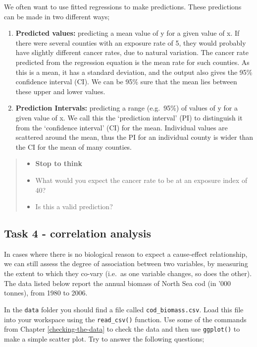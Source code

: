 \documentclass[
]{book}
\providecommand{\tightlist}{%
  \setlength{\itemsep}{0pt}\setlength{\parskip}{0pt}}
\begin{document}
We often want to use fitted regressions to make predictions. These predictions can be made in two different ways;

\begin{enumerate}
\def\labelenumi{\arabic{enumi})}
\tightlist
\item
  \textbf{Predicted values:} predicting a mean value of y for a given value of x. If there were several counties with an exposure rate of 5, they would probably have slightly different cancer rates, due to natural variation. The cancer rate predicted from the regression equation is the mean rate for such counties. As this is a mean, it has a standard deviation, and the output also gives the 95\% confidence interval (CI). We can be 95\% sure that the mean lies between these upper and lower values.
\item
  \textbf{Prediction Intervals:} predicting a range (e.g.~95\%) of values of y for a given value of x. We call this the `prediction interval' (PI) to distinguish it from the `confidence interval' (CI) for the mean. Individual values are scattered around the mean, thus the PI for an individual county is wider than the CI for the mean of many counties.
\end{enumerate}

\begin{quote}
\begin{itemize}
\tightlist
\item
  \textbf{Stop to think}
\item
  What would you expect the cancer rate to be at an exposure index of 40?
\item
  Is this a valid prediction?
\end{itemize}
\end{quote}

\subsection*{Task 4 - correlation analysis}\label{task-4---correlation-analysis}

In cases where there is no biological reason to expect a cause-effect relationship, we can still assess the degree of association between two variables, by measuring the extent to which they co-vary (i.e.~as one variable changes, so does the other). The data listed below report the annual biomass of North Sea cod (in '000 tonnes), from 1980 to 2006.

In the \texttt{data} folder you should find a file called \texttt{cod\_biomass.csv}. Load this file into your workspace using the \texttt{read\_csv()} function. Use some of the commands from Chapter \ref{checking-the-data} to check the data and then use \texttt{ggplot()} to make a simple scatter plot. Try to answer the following questions;
\end{document}
